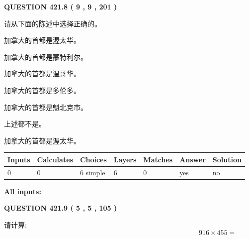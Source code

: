 \documentclass{ctexart}
\begin{document}
{\textbf{\Large{QUESTION
421.8 
 ( 9 , 9 , 201 )
}}}
  
  
请从下面的陈述中选择正确的。
 
 
加拿大的首都是渥太华。
 
 
加拿大的首都是蒙特利尔。
 
 
加拿大的首都是温哥华。
 
 
加拿大的首都是多伦多。
 
 
加拿大的首都是魁北克市。
 
 
 上述都不是。
 
 
\noindent{}
 
 
加拿大的首都是渥太华。
 
 
\noindent{}
 
 
   
   
   
   
\noindent\begin{tabular}{|l|l|l|l|l|l|l|}
 \hline
Inputs & Calculates & Choices & Layers & Matches & Answer & Solution \\ \hline
 0  & 
 0  & 
 6
  simple  
  & 
 6  & 
 0  & 
  yes & 
  no 
  \\ \hline
 \end{tabular}
   
   
   
   
\noindent{}
   
   
   
   
\noindent\vspace{0.1in}\hspace{-0.08in} {\textbf{\Large{All inputs: }}}
   
   
  
\vspace{0.2in}
  
{\textbf{\Large{QUESTION
421.9 
 ( 5 , 5 , 105 )
}}}
  
  
 
请计算:
\begin{equation}
916  \times    %
455 = \nonumber
\end{equation}
 
\end{document}
